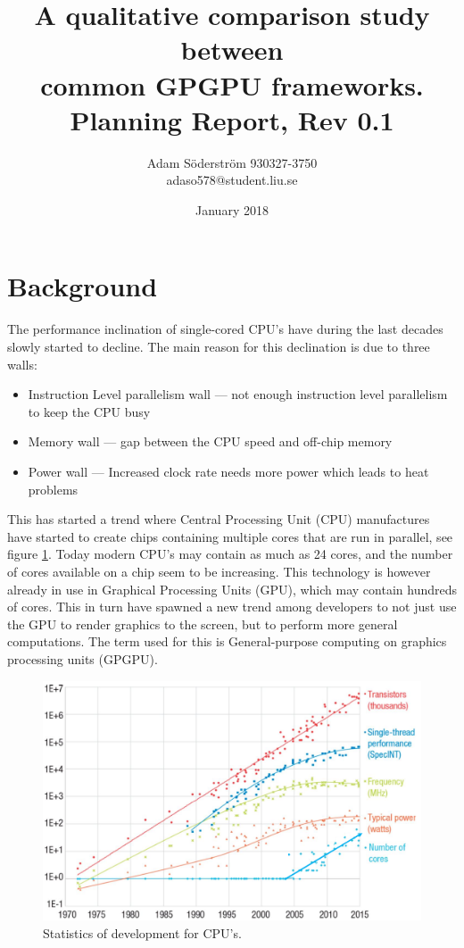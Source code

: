 \documentclass{article}
\title{%
  A qualitative comparison study between \\  
  common GPGPU frameworks. \\
  \large Planning Report, Rev 0.1 \\
}
\author{
    Adam Söderström 930327-3750 \\
    adaso578@student.liu.se 
}
\date{January 2018}
\begin{document}
\maketitle

\section{Background}
The performance inclination of single-cored CPU's have during the last decades slowly started to decline. The main reason for this declination is due to three walls:

\begin{itemize}
    \item Instruction Level parallelism wall --- not enough instruction level parallelism to keep the CPU busy
    \item Memory wall --- gap between the CPU speed and off-chip memory
    \item Power wall --- Increased clock rate needs more power which leads to heat problems
\end{itemize}

\noindent This has started a trend where Central Processing Unit (CPU) manufactures have started to create chips containing multiple cores that are run in parallel, see figure \ref{fig:cpuStats}. Today modern CPU's may contain as much as 24 cores, and the number of cores available on a chip seem to be increasing. This technology is however already in use in Graphical Processing Units (GPU), which may contain hundreds of cores. This in turn have spawned a new trend among developers to not just use the GPU to render graphics to the screen, but to perform more general computations. The term used for this is General-purpose computing on graphics processing units (GPGPU).

\begin{figure}[!h]
    \centering
    \includegraphics[width=12cm]{Figs/CPUStats.png}
    \caption{Statistics of development for CPU's. \cite{CPUStats}}
    \label{fig:cpuStats}
\end{figure}
\end{document}
